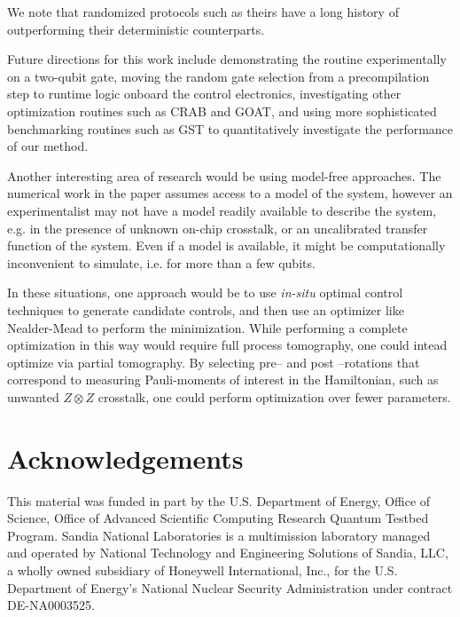 \documentclass[aps,nofootinbib,pra,notitlepage,twocolumn]{revtex4-1}
\newcommand{\note}[1]{}
\begin{document}
We note that randomized protocols such as theirs have a long history of outperforming their deterministic counterparts. \note{Find some citations - Viola and others - and write a sentence about them, maybe move this to the conclusion? We should also discuss randomized compiling there. } 

Future directions for this work include demonstrating the routine experimentally on a two-qubit gate, moving the random gate selection from a precompilation step to runtime logic onboard the control electronics, investigating other optimization routines such as CRAB \cite{Caneva2011} and GOAT\cite{Machnes2018}, and using more sophisticated benchmarking routines such as GST\cite{BlumeKohout2017} to quantitatively investigate the performance of our method.

Another interesting area of research would be using model-free approaches. The numerical work in the paper assumes access to a model of the system, however an experimentalist may not have a model readily available to describe the system, e.g. in the presence of unknown on-chip crosstalk, or an uncalibrated transfer function of the system. Even if a model is available, it might be computationally inconvenient to simulate, i.e. for more than a few qubits.

In these situations, one approach would be to use \textit{in-situ} optimal control techniques \cite{Wu2018, Kelly2014, Ferrie2015} to generate candidate controls, and then use an optimizer like Nealder-Mead to perform the minimization. While performing a complete optimization in this way would require full process tomography, one could intead optimize via partial tomography. By selecting pre-- and post --rotations that correspond to measuring Pauli-moments of interest in the Hamiltonian, such as unwanted $Z\otimes Z$ crosstalk, one could perform optimization over fewer parameters.

\section{Acknowledgements}
\label{sec:acknowledgements}
This material was funded in part by the U.S. Department of Energy, Office of Science, Office of Advanced Scientific Computing Research Quantum Testbed Program. Sandia National Laboratories is a multimission laboratory managed and operated by National Technology and Engineering Solutions of Sandia, LLC, a wholly owned subsidiary of Honeywell International, Inc., for the U.S. Department of Energy's National Nuclear Security Administration under contract DE-NA0003525.

\end{document}
